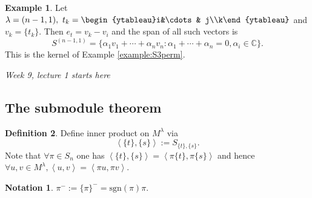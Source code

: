 \documentclass{article}
\newcommand{\sgn}{\text{sgn}}
\newcommand{\la}{\left\langle}
\newcommand{\ra}{\right\rangle}
\newcommand{\C}{\mathbb{C}}
\theoremstyle{definition}
\newtheorem{defn}{Definition}[subsection]
\newtheorem{example}[defn]{Example}
\newtheorem*{notation}{Notation}
\begin{document}
\begin{example}
Let $\lambda=(n-1,1),\ t_k=\begin{ytableau}i&\cdots & j\\k\end{ytableau}$ and $v_k=\{t_k\}$. Then $e_t=v_k-v_i$ and the span of all such vectors is
\[
S^{(n-1,1)}=\{\alpha_1 v_1+\cdots+\alpha_n v_n : \alpha_1+\cdots+\alpha_n=0,\alpha_i\in\C\}.
\]
This is the kernel of Example \ref{example:S3perm}.
\end{example}

\begin{flushright}
\textit{Week 9, lecture 1 starts here}
\end{flushright}

\subsection{The submodule theorem}
\begin{defn}
Define inner product on $M^\lambda$ via
\[
\la \{t\},\{s\}\ra := S_{\{t\},\{s\}}.
\]
Note that $\forall\pi\in S_n$ one has $\la \{t\},\{s\}\ra=\la \pi\{t\},\pi\{s\}\ra$ and hence $\forall u,v\in M^\lambda, \la u,v\ra=\la \pi u,\pi v\ra$.
\end{defn}

\begin{notation}
$\pi^-:=\{\pi\}^-=\sgn(\pi)\pi$.
\end{notation}
\end{document}
